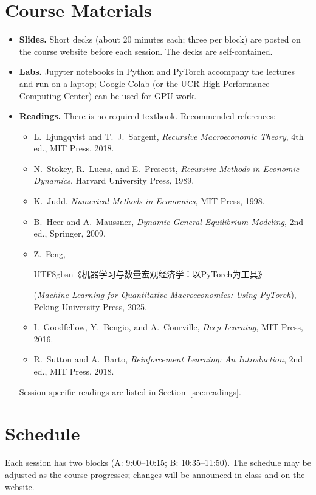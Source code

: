 \documentclass[11pt]{article}
\newcommand{\zh}[1]{\begin{CJK*}{UTF8}{gbsn}#1\end{CJK*}}
\begin{document}
\section{Course Materials}

\begin{itemize}
  \item \textbf{Slides.} Short decks (about 20 minutes each; three per block) are posted on the course website before each session. The decks are self-contained.
  \item \textbf{Labs.} Jupyter notebooks in Python and PyTorch accompany the lectures and run on a laptop; Google Colab (or the UCR High-Performance Computing Center) can be used for GPU work.
  \item \textbf{Readings.} There is no required textbook. Recommended references:
  \begin{itemize}
    \item L.~Ljungqvist and T.~J.~Sargent, \emph{Recursive Macroeconomic Theory}, 4th ed., MIT Press, 2018.
    \item N.~Stokey, R.~Lucas, and E.~Prescott, \emph{Recursive Methods in Economic Dynamics}, Harvard University Press, 1989.
    \item K.~Judd, \emph{Numerical Methods in Economics}, MIT Press, 1998.
    \item B.~Heer and A.~Maussner, \emph{Dynamic General Equilibrium Modeling}, 2nd ed., Springer, 2009.
    \item Z.~Feng, \zh{《机器学习与数量宏观经济学：以PyTorch为工具》} (\emph{Machine Learning for Quantitative Macroeconomics: Using PyTorch}), Peking University Press, 2025.
    \item I.~Goodfellow, Y.~Bengio, and A.~Courville, \emph{Deep Learning}, MIT Press, 2016.
    \item R.~Sutton and A.~Barto, \emph{Reinforcement Learning: An Introduction}, 2nd ed., MIT Press, 2018.
  \end{itemize}
  Session-specific readings are listed in Section~\ref{sec:readings}.
\end{itemize}

\clearpage
\section{Schedule}

Each session has two blocks (A: 9:00--10:15; B: 10:35--11:50). The schedule may be adjusted as the course progresses; changes will be announced in class and on the website.
\end{document}
